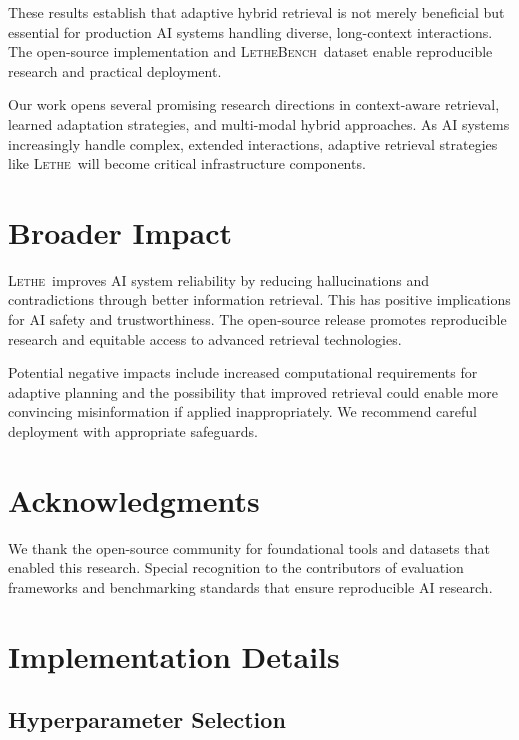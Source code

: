 \documentclass[letterpaper]{article}
\newcommand{\lethe}{\textsc{Lethe}}
\newcommand{\lethebench}{\textsc{LetheBench}}
\begin{document}
These results establish that adaptive hybrid retrieval is not merely beneficial but essential for production AI systems handling diverse, long-context interactions. The open-source implementation and \lethebench\ dataset enable reproducible research and practical deployment.

Our work opens several promising research directions in context-aware retrieval, learned adaptation strategies, and multi-modal hybrid approaches. As AI systems increasingly handle complex, extended interactions, adaptive retrieval strategies like \lethe\ will become critical infrastructure components.

\section*{Broader Impact}

\lethe\ improves AI system reliability by reducing hallucinations and contradictions through better information retrieval. This has positive implications for AI safety and trustworthiness. The open-source release promotes reproducible research and equitable access to advanced retrieval technologies.

Potential negative impacts include increased computational requirements for adaptive planning and the possibility that improved retrieval could enable more convincing misinformation if applied inappropriately. We recommend careful deployment with appropriate safeguards.

\section*{Acknowledgments}

We thank the open-source community for foundational tools and datasets that enabled this research. Special recognition to the contributors of evaluation frameworks and benchmarking standards that ensure reproducible AI research.




\newpage
\appendix

\section{Implementation Details}

\subsection{Hyperparameter Selection}
\end{document}
